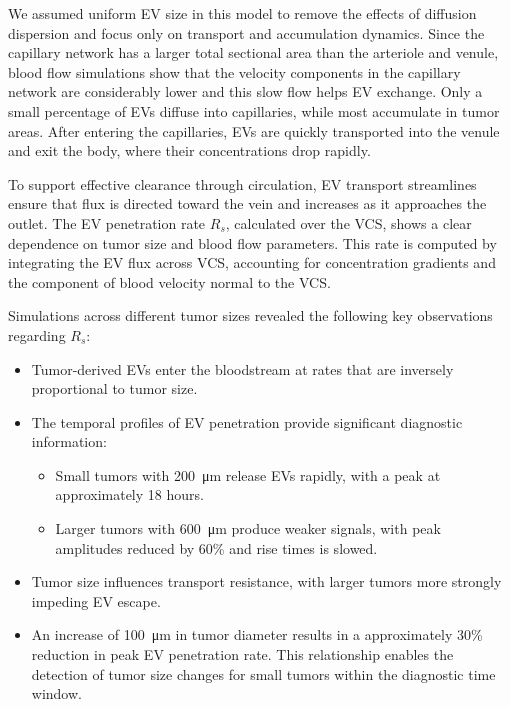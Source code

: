 \documentclass[sigconf]{acmart}
\begin{document}
We assumed uniform EV size in this model to remove the effects of diffusion dispersion and focus only on transport and accumulation dynamics. Since the capillary network has a larger total sectional area than the arteriole and venule, blood flow simulations show that the velocity components in the capillary network are considerably lower and this slow flow helps EV exchange. Only a small percentage of EVs diffuse into capillaries, while most accumulate in tumor areas. After entering the capillaries, EVs are quickly transported into the venule and exit the body, where their concentrations drop rapidly. 

To support effective clearance through circulation, EV transport streamlines ensure that flux is directed toward the vein and increases as it approaches the outlet. The EV penetration rate \( R_s \), calculated over the VCS, shows a clear dependence on tumor size and blood flow parameters. This rate is computed by integrating the EV flux across VCS, accounting for concentration gradients and the component of blood velocity normal to the VCS.

Simulations across different tumor sizes revealed the following key observations regarding $R_s$:
\begin{itemize}
    \item Tumor-derived EVs enter the bloodstream at rates that are inversely proportional to tumor size.

    \item The temporal profiles of EV penetration provide significant diagnostic information:
    \begin{itemize}
        \item Small tumors with 200~\si{\micro\meter} release EVs rapidly, with a peak at approximately 18 hours.
        \item Larger tumors with 600~\si{\micro\meter} produce weaker signals, with peak amplitudes reduced by 60\% and rise times is slowed.
    \end{itemize}
    
    \item Tumor size influences transport resistance, with larger tumors more strongly impeding EV escape.

    \item An increase of 100~\si{\micro\meter} in tumor diameter results in a approximately 30\% reduction in peak EV penetration rate. This relationship enables the detection of tumor size changes for small tumors within the diagnostic time window.
\end{itemize}
\end{document}

